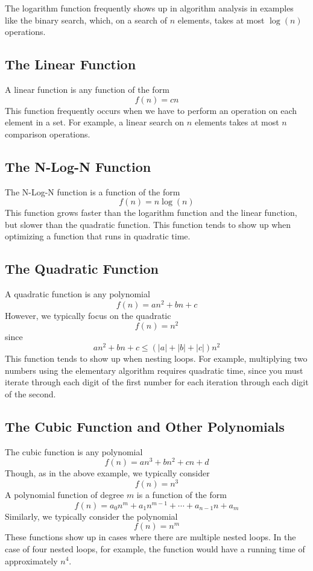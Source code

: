 \documentclass[a4paper]{article}
\begin{document}
  The logarithm function frequently shows up in algorithm analysis in examples like the binary search, which, on a search of $n$ elements, takes at most $\log(n)$ operations.

 \subsection{The Linear Function}

  A linear function is any function of the form \[f(n)=cn\] This function frequently occurs when we have to perform an operation on each element in a set. For example, a linear search on $n$ elements takes at most $n$ comparison operations.

\subsection{The N-Log-N Function}

  The N-Log-N function is a function of the form \[f(n)=n\log(n)\] This function grows faster than the logarithm function and the linear function, but slower than the quadratic function. This function tends to show up when optimizing a function that runs in quadratic time.
 
 \subsection{The Quadratic Function}

  A quadratic function is any polynomial \[f(n) = an^2+bn+c\] However, we typically focus on the quadratic \[f(n) = n^2\] since \[an^2+bn+c\leq\left(|a|+|b|+|c|\right)n^2\] This function tends to show up when nesting loops. For example, multiplying two numbers using the elementary algorithm requires quadratic time, since you must iterate through each digit of the first number for each iteration through each digit of the second.

 \subsection{The Cubic Function and Other Polynomials}

  The cubic function is any polynomial \[f(n)=an^3+bn^2+cn+d\] Though, as in the above example, we typically consider \[f(n) = n^3\] A polynomial function of degree $m$ is a function of the form \[f(n)=a_0n^m+a_1n^{m-1}+\cdots+a_{n-1}n+a_m\] Similarly, we typically consider the polynomial \[f(n)=n^m\] These functions show up in cases where there are multiple nested loops. In the case of four nested loops, for example, the function would have a running time of approximately $n^4$.
\end{document}
